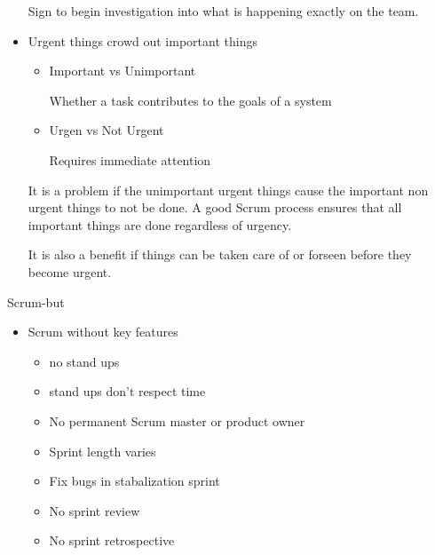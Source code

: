 \documentclass{report}
\begin{document}
\begin{description}
\begin{itemize}
\begin{mdframed}
                    Sign to begin investigation into what
                    is happening exactly on the team.
                \end{mdframed}
            \item Urgent things crowd out important things
                \begin{itemize}
                    \item Important vs Unimportant
                        \begin{mdframed}
                            Whether a task contributes
                            to the goals of a system
                        \end{mdframed}
                    \item Urgen vs Not Urgent
                        \begin{mdframed}
                            Requires immediate attention
                        \end{mdframed}
                \end{itemize} 

                It is a problem if the unimportant urgent
                things cause the important non urgent things
                to not be done. A good Scrum process
                ensures that all important things are done
                regardless of urgency.

                It is also a benefit if things can be taken
                care of or forseen before they become urgent.
        \end{itemize}
    \item Scrum-but
        \begin{itemize}
            \item Scrum without key features
                \begin{itemize}
                    \item no stand ups
                    \item stand ups don't respect time
                    \item No permanent Scrum master or product owner
                    \item Sprint length varies
                    \item Fix bugs in stabalization sprint
                    \item No sprint review
                    \item No sprint retrospective
                \end{itemize}
        \end{itemize}


\end{description}
\end{document}
